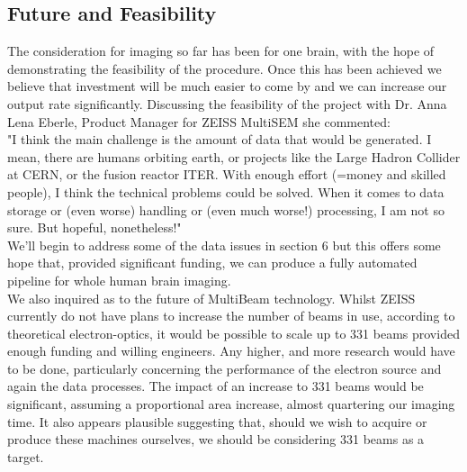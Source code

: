 \documentclass[a4paper, 11pt]{article}
\numberwithin{equation}{section}
\begin{document}
\subsection{Future and Feasibility}
\label{MultiSemMeth}
The consideration for imaging so far has been for one brain, with the hope of demonstrating the feasibility of the procedure. Once this has been achieved we believe that investment will be much easier to come by and we can increase our output rate significantly. Discussing the feasibility of the project with Dr. Anna Lena Eberle, Product Manager for ZEISS MultiSEM she commented:\\
\newline
"I think the main challenge is the amount of data that would be generated. I mean, there are humans orbiting earth, or projects like the Large Hadron Collider at CERN, or the fusion reactor ITER. With enough effort (=money and skilled people), I think the technical problems could be solved. When it comes to data storage or (even worse) handling or (even much worse!) processing, I am not so sure. But hopeful, nonetheless!"\\
\newline
 We'll begin to address some of the data issues in section 6 but this offers some hope that, provided significant funding, we can produce a fully automated pipeline for whole human brain imaging.\\
We also inquired as to the future of MultiBeam technology. Whilst ZEISS currently do not have plans to increase the number of beams in use, according to theoretical electron-optics, it would be possible to scale up to 331 beams provided enough funding and willing engineers. Any higher, and more research would have to be done, particularly concerning the performance of the electron source and again the data processes. The impact of an increase to 331 beams would be significant, assuming a proportional area increase, almost quartering our imaging time. It also appears plausible suggesting that, should we wish to acquire or produce these machines ourselves, we should be considering 331 beams as a target. \\
\end{document}
